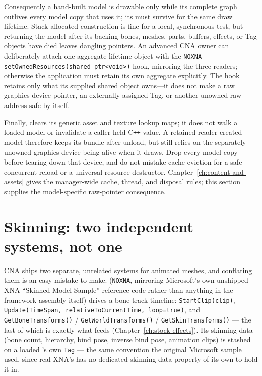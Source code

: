 Consequently a hand-built model is drawable only while its complete graph outlives every model
copy that uses it; its  must survive for the same draw lifetime.
Stack-allocated construction is fine for a local, synchronous test, but returning the model
after its backing bones, meshes, parts, buffers, effects, or Tag objects have died leaves
dangling pointers. An advanced CNA owner can deliberately attach one aggregate lifetime object
with the \texttt{NOXNA}
\texttt{setOwnedResources(shared\_ptr<void>)} hook, mirroring the three readers; otherwise the
application must retain its own aggregate explicitly. The hook retains only what its supplied
shared object owns---it does not make a raw graphics-device pointer, an externally assigned Tag,
or another unowned raw address safe by itself.

Finally,  clears its generic asset and texture lookup maps;
it does not walk a loaded model or invalidate a caller-held C\texttt{++} value. A retained
reader-created model therefore keeps its bundle after unload, but still relies on the separately
unowned graphics device being alive when it draws. Drop every model copy before tearing down that
device, and do not mistake cache eviction for a safe concurrent reload or a universal resource
destructor. Chapter~\ref{ch:content-and-assets} gives the manager-wide cache, thread, and
disposal rules; this section supplies the model-specific raw-pointer consequence.

\section{Skinning: two independent systems, not one}

CNA ships two separate, unrelated systems for animated meshes, and conflating them is an
easy mistake to make.  (\texttt{NOXNA}, mirroring Microsoft's own
unshipped XNA ``Skinned Model Sample'' reference code rather than anything in the framework
assembly itself) drives a bone-track timeline: \texttt{StartClip(clip)},
\texttt{Update(TimeSpan, relativeToCurrentTime, loop=true)}, and
\texttt{GetBoneTransforms()} / \texttt{GetWorldTransforms()} / \texttt{GetSkinTransforms()} ---
the last of which is exactly what feeds 
(Chapter~\ref{ch:stock-effects}). Its skinning data (bone count, hierarchy, bind pose,
inverse bind pose, animation clips) is stashed on a loaded 's own
\texttt{Tag} --- the same convention the original Microsoft sample used, since real XNA's
 has no dedicated skinning-data property of its own to hold it in.

